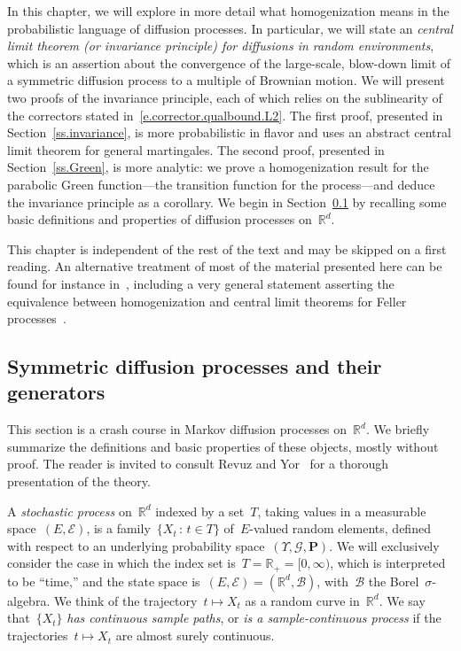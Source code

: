 \documentclass[11pt,twoside]{article} %
\numberwithin{equation}{section}
\theoremstyle{definition}
\newcommand*{\R}{\ensuremath{\mathbb{R}}}
\newcommand*{\Rd}{\ensuremath{\mathbb{R}^d}}
\begin{document}
\smallskip

In this chapter, we will explore in more detail what homogenization means in the probabilistic language of diffusion processes. In particular, we will state an \emph{central limit theorem (or invariance principle) for diffusions in random environments}, which is an assertion about the convergence of the large-scale, blow-down limit of a symmetric diffusion process to a multiple of Brownian motion. We will present two proofs of the invariance principle, each of which relies on the sublinearity of the correctors stated in~\eqref{e.corrector.qualbound.L2}. The first proof, presented in Section~\ref{ss.invariance}, is more probabilistic in flavor and uses an abstract central limit theorem for general martingales. The second proof, presented in Section~\ref{ss.Green}, is more analytic: we prove a homogenization result for the parabolic Green function---the transition function for the process---and deduce the invariance principle as a corollary. We begin in Section~\ref{ss.markov} by recalling some basic definitions and properties of diffusion processes on~$\Rd$. 

\smallskip

This chapter is independent of the rest of the text and may be skipped on a first reading. An alternative treatment of most of the material presented here can be  found for instance in~\cite{Kallenberg}, including a very general statement asserting the equivalence between homogenization and central limit theorems for Feller processes~\cite[Theorem 19.25]{Kallenberg}.

\subsection{Symmetric diffusion processes and their generators}
\label{ss.markov}

This section is a crash course in Markov diffusion processes on~$\Rd$. We briefly summarize the definitions and basic properties of these objects, mostly without proof. 
The reader is invited to consult Revuz and Yor~\cite{RY} for a thorough presentation of the theory.

\smallskip

A \emph{stochastic process} on~$\Rd$ indexed by a set~$T$, taking values in a measurable space~$(E, \mathscr{E})$, is a family~$\{ X_t\,:\,t\in T\}$ of~$E$-valued random elements, defined with respect to an underlying probability space~$(\Upsilon, \mathcal{G}, \mathbf{P})$. 
We will exclusively consider the case in which the index set is~$T = \R_+ = [0,\infty)$, which is interpreted to be ``time,'' and the state space is~$(E,\mathscr{E}) = (\R^d,\mathscr{B})$, with~$\mathscr{B}$ the Borel~$\sigma$-algebra. 
We think of the trajectory~$t \mapsto X_t$ as a random curve in~$\Rd$. 
We say that~$\{ X_t\}$ \emph{has continuous sample paths}, or \emph{is a sample-continuous process} if the trajectories~$t\mapsto X_t$ are almost surely continuous. 
\end{document}
